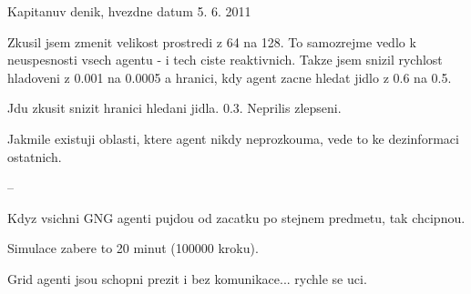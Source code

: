 Kapitanuv denik, hvezdne datum 5. 6. 2011

Zkusil jsem zmenit velikost prostredi z 64 na 128. To samozrejme vedlo k neuspesnosti
vsech agentu - i tech ciste reaktivnich. Takze jsem snizil rychlost hladoveni z 0.001 na 0.0005 a hranici,
kdy agent zacne hledat jidlo z 0.6 na 0.5.

Jdu zkusit snizit hranici hledani jidla. 0.3. Neprilis zlepseni.

Jakmile existuji oblasti, ktere agent nikdy neprozkouma, vede to ke dezinformaci
ostatnich.

--

Kdyz vsichni GNG agenti pujdou od zacatku po stejnem predmetu, tak chcipnou.

Simulace zabere to 20 minut (100000 kroku).

Grid agenti jsou schopni prezit i bez komunikace... rychle se uci.

